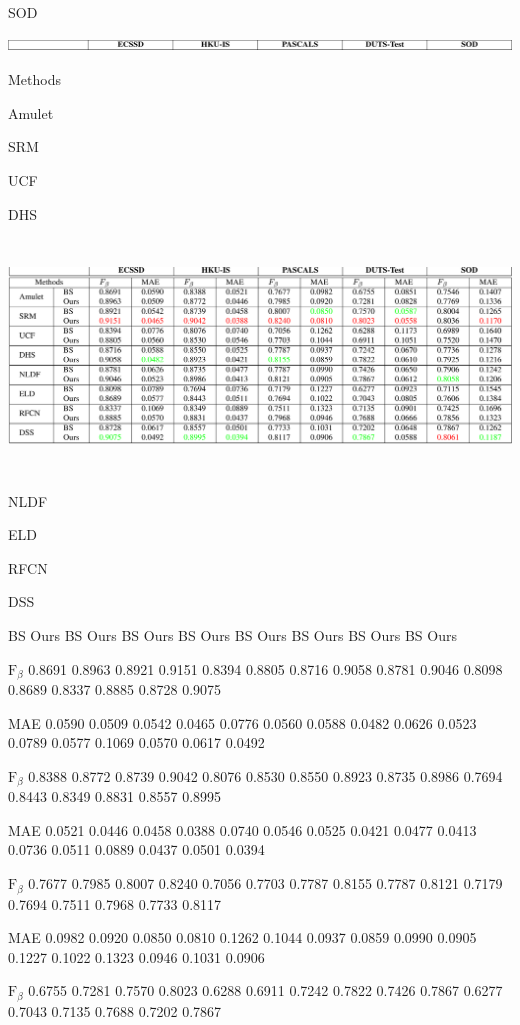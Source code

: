 \documentclass[a4paper,10pt]{article}
\begin{document}
SOD
\begin{center}
\includegraphics[width=175.34mm,height=3.64mm]{./zengyu_images/image016.eps}
\end{center}
Methods

Amulet

SRM

UCF

DHS
\begin{center}
\includegraphics[width=175.77mm,height=62.15mm]{./zengyu_images/image017.eps}
\end{center}
NLDF

ELD

RFCN

DSS

BS Ours BS Ours BS Ours BS Ours BS Ours BS Ours BS Ours BS Ours

$\mathrm{F}_{\beta}$ 0.8691 0.8963 0.8921 0.9151 0.8394 0.8805 0.8716 0.9058 0.8781 0.9046 0.8098 0.8689 0.8337 0.8885 0.8728 0.9075

MAE 0.0590 0.0509 0.0542 0.0465 0.0776 0.0560 0.0588 0.0482 0.0626 0.0523 0.0789 0.0577 0.1069 0.0570 0.0617 0.0492

$\mathrm{F}_{\beta}$ 0.8388 0.8772 0.8739 0.9042 0.8076 0.8530 0.8550 0.8923 0.8735 0.8986 0.7694 0.8443 0.8349 0.8831 0.8557 0.8995

MAE 0.0521 0.0446 0.0458 0.0388 0.0740 0.0546 0.0525 0.0421 0.0477 0.0413 0.0736 0.0511 0.0889 0.0437 0.0501 0.0394

$\mathrm{F}_{\beta}$ 0.7677 0.7985 0.8007 0.8240 0.7056 0.7703 0.7787 0.8155 0.7787 0.8121 0.7179 0.7694 0.7511 0.7968 0.7733 0.8117

MAE 0.0982 0.0920 0.0850 0.0810 0.1262 0.1044 0.0937 0.0859 0.0990 0.0905 0.1227 0.1022 0.1323 0.0946 0.1031 0.0906

$\mathrm{F}_{\beta}$ 0.6755 0.7281 0.7570 0.8023 0.6288 0.6911 0.7242 0.7822 0.7426 0.7867 0.6277 0.7043 0.7135 0.7688 0.7202 0.7867
\end{document}
